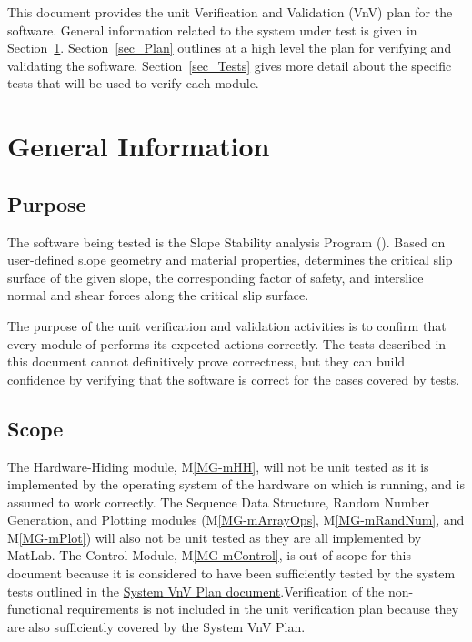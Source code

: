\documentclass[12pt, titlepage]{article}
\newcommand{\mref}[1]{M\ref{#1}}
\begin{document}
\newpage


This document provides the unit Verification and Validation (VnV) plan for the 
software. General information related to the system under test is given in 
Section~\ref{sec_Info}. Section~\ref{sec_Plan} outlines at a high level the 
plan for verifying and validating the software. Section~\ref{sec_Tests} gives 
more detail about the specific tests that will be used to verify each module.

\section{General Information} \label{sec_Info}

\subsection{Purpose}

\noindent The software being tested is the Slope Stability analysis Program 
(\progname{}). Based on user-defined slope geometry and material properties, 
\progname{} determines the critical slip surface of the given slope, the 
corresponding factor of safety, and interslice normal and shear forces along 
the critical slip surface.

\noindent The purpose of the unit verification and validation activities is to 
confirm that every module of \progname{} performs its expected actions 
correctly. The tests described in this document cannot definitively prove 
correctness, but they can build confidence by verifying that the software is 
correct for the cases covered by tests.

\subsection{Scope} \label{Scope}

The Hardware-Hiding module, \noindent \mref{MG-mHH}, will not be unit tested as 
it is implemented by the operating system of the hardware on which \progname{} 
is running, and is assumed to work correctly. The Sequence Data Structure, 
Random Number Generation, and Plotting modules (\mref{MG-mArrayOps}, 
\mref{MG-mRandNum}, and \mref{MG-mPlot}) will also not be unit tested as they 
are all implemented by MatLab. The Control Module, \mref{MG-mControl}, is out 
of scope for this document because it is considered to have been sufficiently 
tested by the system tests outlined in the 
\href{https://github.com/smiths/caseStudies/blob/master/CaseStudies/ssp/docs/VnVPlan/SystVnVPlan/SystVnVPlan.pdf}
{System VnV Plan document}.Verification of the non-functional requirements is 
not included in the unit verification plan because they are also sufficiently 
covered by the System VnV Plan.
\end{document}
